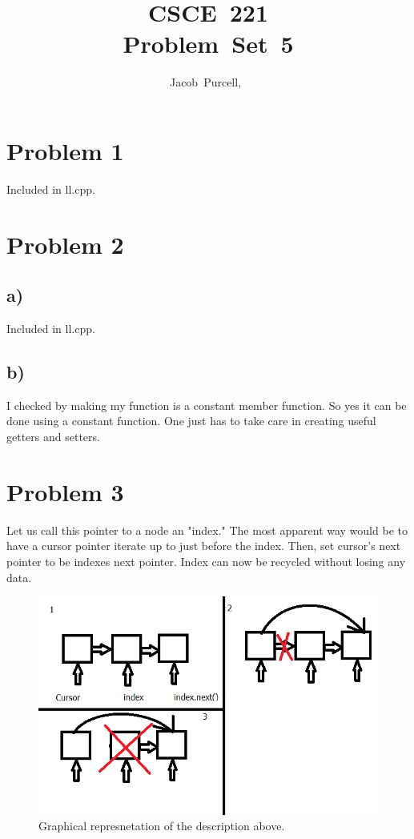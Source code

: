 \documentclass[journal]{IEEEtran}
\begin{document}
\title{CSCE~221 \\ Problem~Set~5}

\author{Jacob~Purcell,~}

\maketitle
\section*{Problem 1}
	Included in ll.cpp.

\section*{Problem 2}
\subsection*{a)}
	Included in ll.cpp.
\subsection*{b)}
	I checked by making my function is a constant member function. So yes it can 
	be done using a constant function. One just has to take care in creating 
	useful getters and setters.

\section*{Problem 3}
	Let us call this pointer to a node an "index." The most apparent way 
	would be to have a cursor pointer iterate up to just before the index. 
	Then, set cursor's next pointer to be indexes next pointer. Index can 
	now be recycled without losing any data. 

	\begin{figure}[h!]
		\includegraphics[scale = 0.5]{Untitled.png}
		\caption{Graphical represnetation of the description above.}
	\end{figure}
\end{document}
